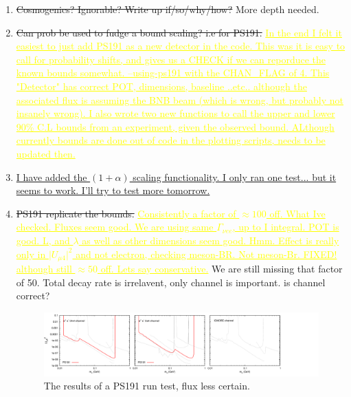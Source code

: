 \documentclass[11pt, a4paper]{article}
\newcommand{\newtext}[2]{\textcolor{#1}{\ul{#2}}}
\begin{document}
\begin{enumerate}
\item \sout{Cosmogenics? Ignorable? Write up if/so/why/how?} More depth needed.

\item \sout{Can prob be used to fudge a bound scaling? i.e for PS191.}
\newtext{MARK}{In the end I felt it easiest to just add PS191 as a new detector
in the code. This was it is easy to call for probability shifts, and gives us a
CHECK if we can reporduce the known bounds somewhat.  --using-ps191 with the
CHAN\_FLAG of 4.  This "Detector" has correct POT, dimensions, baseline ..etc..
although the associated flux is assuming the BNB beam (which is wrong, but
probably not insanely wrong). I also wrote two new functions to call the upper
and lower 90\% C.L bounds from an experiment, given the observed bound.
ALthough currently bounds are done out of code in the plotting scripts, needs
to be updated then. }

\item \newtext{PB}{I have added the $(1+\alpha)$ scaling functionality. I only
ran one test... but it seems to work. I'll try to test more tomorrow.} 

\item \sout{PS191 replicate the bounds.} \newtext{MARK}{Consistently a factor of $\approx 100$ off. What Ive checked. Fluxes seem good. We are using same $\Gamma_{\nu ee}$, up to I integral. POT is good. L, and $\lambda$ as well as other dimensions seem good. Hmm. Effect is really only in $\vert U_{\mu 4}\vert^2$ and not electron, checking meson-BR. Not meson-Br. FIXED! although still $\approx 50$ off. Lets say conservative.} 
	We are still missing that factor of 50. Total decay rate is irrelavent, only channel is important. is channel correct?
\begin{figure}[t]
\center
\includegraphics[width=1.0\textwidth]{figures/zerobg_um4_ps191_test.pdf}
\caption{The results of a PS191 run test, flux less certain.}
\end{figure}


\end{enumerate}



{}
\end{document}
